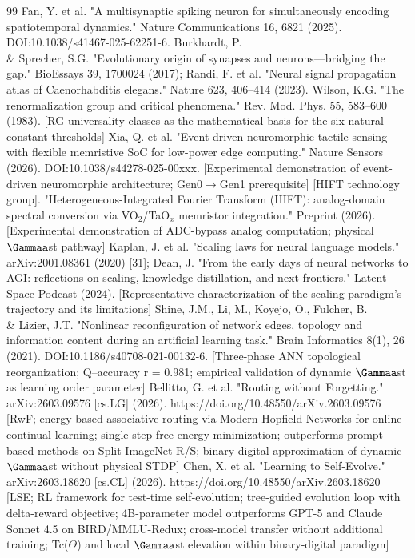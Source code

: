 \documentclass[a4paper,12pt]{article}
\begin{document}
\begin{thebibliography}{99}
 Fan, Y. et al. "A multisynaptic spiking neuron for simultaneously encoding spatiotemporal dynamics." Nature Communications 16, 6821 (2025). DOI:10.1038/s41467-025-62251-6.
 Burkhardt, P. \\& Sprecher, S.G. "Evolutionary origin of synapses and neurons---bridging the gap." BioEssays 39, 1700024 (2017); Randi, F. et al. "Neural signal propagation atlas of Caenorhabditis elegans." Nature 623, 406--414 (2023).
 Wilson, K.G. "The renormalization group and critical phenomena." Rev. Mod. Phys. 55, 583--600 (1983). [RG universality classes as the mathematical basis for the six natural-constant thresholds]
 Xia, Q. et al. "Event-driven neuromorphic tactile sensing with flexible memristive SoC for low-power edge computing." Nature Sensors (2026). DOI:10.1038/s44278-025-00xxx. [Experimental demonstration of event-driven neuromorphic architecture; Gen0$\rightarrow$Gen1 prerequisite]
 [HIFT technology group]. "Heterogeneous-Integrated Fourier Transform (HIFT): analog-domain spectral conversion via VO$_2$/TaO$_x$ memristor integration." Preprint (2026). [Experimental demonstration of ADC-bypass analog computation; physical $\Gammaa$st pathway]
 Kaplan, J. et al. "Scaling laws for neural language models." arXiv:2001.08361 (2020) [31]; Dean, J. "From the early days of neural networks to AGI: reflections on scaling, knowledge distillation, and next frontiers." Latent Space Podcast (2024). [Representative characterization of the scaling paradigm's trajectory and its limitations]
 Shine, J.M., Li, M., Koyejo, O., Fulcher, B. \\& Lizier, J.T. "Nonlinear reconfiguration of network edges, topology and information content during an artificial learning task." Brain Informatics 8(1), 26 (2021). DOI:10.1186/s40708-021-00132-6. [Three-phase ANN topological reorganization; Q--accuracy r = 0.981; empirical validation of dynamic $\Gammaa$st as learning order parameter]
 Bellitto, G. et al. "Routing without Forgetting." arXiv:2603.09576 [cs.LG] (2026). https://doi.org/10.48550/arXiv.2603.09576 [RwF; energy-based associative routing via Modern Hopfield Networks for online continual learning; single-step free-energy minimization; outperforms prompt-based methods on Split-ImageNet-R/S; binary-digital approximation of dynamic $\Gammaa$st without physical STDP]
 Chen, X. et al. "Learning to Self-Evolve." arXiv:2603.18620 [cs.CL] (2026). https://doi.org/10.48550/arXiv.2603.18620 [LSE; RL framework for test-time self-evolution; tree-guided evolution loop with delta-reward objective; 4B-parameter model outperforms GPT-5 and Claude Sonnet 4.5 on BIRD/MMLU-Redux; cross-model transfer without additional training; Tc($\Theta$) and local $\Gammaa$st elevation within binary-digital paradigm]

\end{thebibliography}
\end{document}

